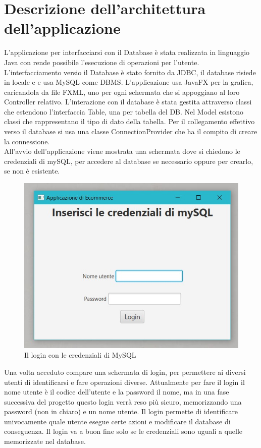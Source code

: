 \documentclass[a4paper,12pt]{report}
\begin{document}
\section{Descrizione dell'architettura dell'applicazione}
L'applicazione per interfacciarsi con il Database è stata realizzata in linguaggio Java con rende possibile l'esecuzione di operazioni per l'utente. 
L'interfacciamento versio il Database è stato fornito da JDBC, il database risiede in locale e e usa MySQL come DBMS. 
L'applicazione usa JavaFX per la grafica, caricandola da file FXML, uno per ogni schermata che si appoggiano al loro Controller relativo. 
L'interazione con il database è stata gestita attraverso classi che estendono l'interfaccia Table, una per tabella del DB. 
Nel Model esistono classi che rappresentano il tipo di dato della tabella. Per il collegamento effettivo verso il database si usa una classe ConnectionProvider che ha il compito di creare la connessione.
\\
All'avvio dell'applicazione viene mostrata una schermata dove si chiedono le credenziali di mySQL, per accedere al database se necessario oppure per crearlo, se non è esistente.
\begin{figure}[H]
	\centering{}
	\includegraphics[width=\textwidth]{img/Application/Credentials.jpg}
	\caption{Il login con le credenziali di MySQL}
\end{figure}
Una volta acceduto compare una schermata di login, per permettere ai diversi utenti di identificarsi e fare operazioni diverse.
Attualmente per fare il login il nome utente è il codice dell'utente e la password il nome, ma in una fase successiva del progetto questo login verrà reso più sicuro, memorizzando una password (non in chiaro) e un nome utente. 
Il login permette di identificare univocamente quale utente esegue certe azioni e modificare il database di conseguenza. Il login va a buon fine solo se le credenziali sono uguali a quelle memorizzate nel database.
\end{document}
